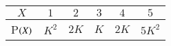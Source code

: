 \begin{tabular}{|c|c|c|c|c|c|} \hline $X$ & $1$ & $2$ & $3$ & $4$ & $5$ \\ \hline P$\left(X\right)$ & $K^2$ & $2K$ & $K$ & $2K$ & $5 K^2$ \\ \hline \end{tabular}
